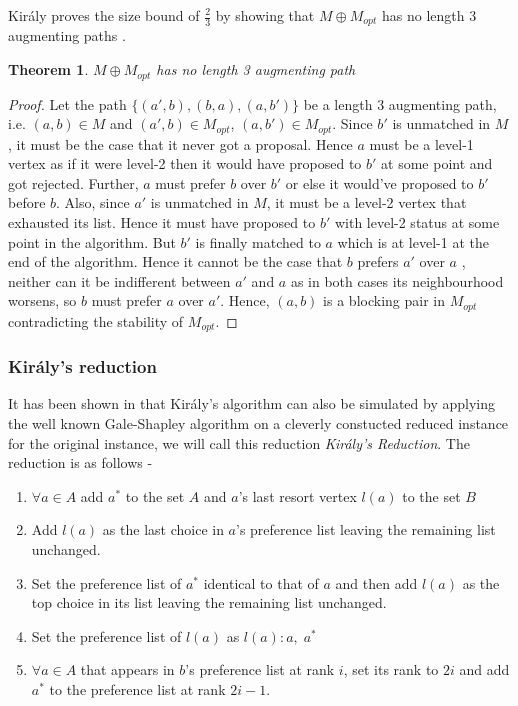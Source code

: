\documentclass[a4paper,10pt]{article}
\theoremstyle{plain} %
\newtheorem{theorem}{Theorem}[section] %
\theoremstyle{plain} %
\begin{document}
Király proves the size bound of $\frac{2}{3}$ by showing that $M \oplus M_{opt}$ has no length 3 augmenting paths \cite{kiraly2011better}.

\begin{theorem}
    $M \oplus M_{opt}$ has no length 3 augmenting path
\end{theorem}

\begin{proof}
    Let the path $\{(a', b), (b, a), (a, b')\}$ be a length 3 augmenting path, i.e. $(a, b) \in M$ and $(a', b) \in M_{opt}$, $(a, b') \in M_{opt}$. Since $b'$ is unmatched in $M$, it must be the case that it never got a proposal. Hence $a$ must be a level-1 vertex as if it were level-2 then it would have proposed to $b'$ at some point and got rejected. Further, $a$ must prefer $b$ over $b'$ or else it would've proposed to $b'$ before $b$. Also, since $a'$ is unmatched in $M$, it must be a level-2 vertex that exhausted its list. Hence it must have proposed to $b'$ with level-2 status at some point in the algorithm. But $b'$ is finally matched to $a$ which is at level-1 at the end of the algorithm. Hence it cannot be the case that $b$ prefers $a'$ over $a$ , neither can it be indifferent between $a'$ and $a$ as in both cases its neighbourhood worsens, so $b$ must prefer $a$ over $a'$. Hence, $(a, b)$ is a blocking pair in $M_{opt}$ contradicting the stability of $M_{opt}$.
\end{proof}

\subsubsection{Király's reduction}
It has been shown in \cite{cseh2018popular} that Király's algorithm can also be simulated by applying the well known Gale-Shapley algorithm on a cleverly constucted reduced instance for the original instance, we will call this reduction \textit{Király's Reduction}. The reduction is as follows -
\begin{enumerate}
    \item $\forall a \in A$ add $a^*$ to the set $A$ and $a$'s last resort vertex $l(a)$ to the set $B$
    \item Add $l(a)$ as the last choice in $a$'s preference list leaving the remaining list unchanged.
    \item Set the preference list of $a^*$ identical to that of $a$ and then add $l(a)$ as the top choice in its list leaving the remaining list unchanged.
    \item Set the preference list of $l(a)$ as $l(a) : a, \; a^*$
    \item $\forall a \in A$ that appears in $b$'s preference list at rank $i$, set its rank to $2i$ and add $a^*$ to the preference list at rank $2i-1$.
\end{enumerate}
\end{document}
